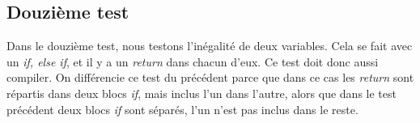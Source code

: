 \documentclass[a4paper,11pt]{article}
\begin{document}
\subsection{Douzième test}
Dans le douzième test, nous testons l'inégalité de deux variables. Cela se fait avec un \textit{if, else if}, et il y a un \textit{return} dans chacun d'eux. Ce test doit donc aussi compiler. On différencie ce test du précédent parce que dans ce cas les \textit{return} sont répartis dans deux blocs \textit{if}, mais inclus l'un dans l'autre, alors que dans le test précédent deux blocs \textit{if} sont séparés, l'un n'est pas inclus dans le reste.
\end{document}
